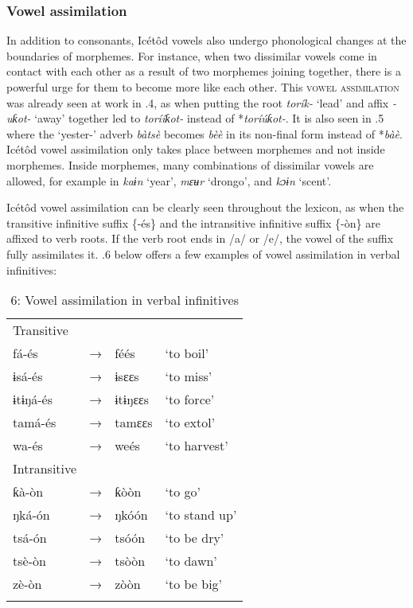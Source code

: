 \subsubsection{Vowel assimilation}

In addition to consonants, Icétôd vowels also undergo phonological changes at the boundaries of morphemes. For instance, when two dissimilar vowels come in contact with each other as a result of two morphemes joining together, there is a powerful urge for them to become more like each other. This \textsc{vowel assimilation} was already seen at work in .4, as when putting the root \textit{torík-} ‘lead’ and affix \textit{{}-uƙot-} ‘away’ together led to \textit{tor}\textit{íí}\textit{ƙot-} instead of *\textit{tor}\textit{íú}\textit{ƙot-}. It is also seen in .5 where the ‘yester-’ adverb \textit{bàtsè} becomes \textit{b}\textit{èè}\textit{} in its non-final form instead of *\textit{b}\textit{àè}. Icétôd vowel assimilation only takes place between morphemes and not inside morphemes. Inside morphemes, many combinations of dissimilar vowels are allowed, for example in \textit{kaɨn} ‘year’, \textit{mɛʉr} ‘drongo’, and \textit{kɔɨn} ‘scent’. 

Icétôd vowel assimilation can be clearly seen throughout the lexicon, as when the transitive infinitive suffix \{-és\} and the intransitive infinitive suffix \{-òn\} are affixed to verb roots. If the verb root ends in /a/ or /e/, the vowel of the suffix fully assimilates it. .6 below offers a few examples of vowel assimilation in verbal infinitives:


\begin{table}
\caption{6: Vowel assimilation in verbal infinitives}
\label{tab:2}


\begin{tabularx}{\textwidth}{XXXX}
\lsptoprule

Transitive &  &  & \\
fá-és & → & féés & ‘to boil’\\
ɨsá-és & → & ɨsɛɛs & ‘to miss’\\
ɨtɨŋá-és & → & ɨtɨŋɛɛs & ‘to force’\\
tamá-és & → & tamɛɛs & ‘to extol’\\
wa-és & → & weés & ‘to harvest’\\
Intransitive &  &  & \\
ƙà-òn & → & ƙòòn & ‘to go’\\
ŋká-ón & → & ŋkóón & ‘to stand up’\\
tsá-ón & → & tsóón & ‘to be dry’\\
tsè-òn & → & tsòòn & ‘to dawn’\\
zè-òn & → & zòòn & ‘to be big’\\
\lspbottomrule
\end{tabularx}
\end{table}

